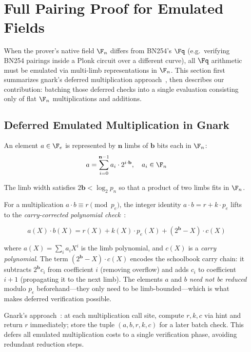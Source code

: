 \section{Full Pairing Proof for Emulated Fields}
\label{sec:emulated}

When the prover's native field $\F_n$ differs from BN254's $\Fq$ (e.g.\ verifying BN254 pairings inside a Plonk circuit over a different curve), all $\Fq$ arithmetic must be emulated via multi-limb representations in $\F_n$. This section first summarizes gnark's deferred multiplication approach~\cite{gnark}, then describes our contribution: batching those deferred checks into a single evaluation consisting only of flat $\F_n$ multiplications and additions.

\subsection{Deferred Emulated Multiplication in Gnark}

An element $a \in \F_e$ is represented by $\mathbf{n}$ limbs of $\mathbf{b}$ bits each in $\F_n$:
$$a = \sum_{i=0}^{\mathbf{n}-1} a_i \cdot 2^{i \cdot \mathbf{b}}, \quad a_i \in \F_n$$

The limb width satisfies $2\mathbf{b} < \log_2 p_n$ so that a product of two limbs fits in $\F_n$.

For a multiplication $a \cdot b \equiv r \pmod{p_e}$, the integer identity $a \cdot b = r + k \cdot p_e$ lifts to the \emph{carry-corrected polynomial check}~\cite{gnark}:

\begin{equation}
  \label{eq:emul-mul}
  a(X) \cdot b(X) = r(X) + k(X) \cdot p_e(X) + (2^{\mathbf{b}} - X) \cdot c(X)
\end{equation}

where $a(X) = \sum_i a_i X^i$ is the limb polynomial, and $c(X)$ is a \emph{carry polynomial}. The term $(2^{\mathbf{b}} - X) \cdot c(X)$ encodes the schoolbook carry chain: it subtracts $2^{\mathbf{b}} c_i$ from coefficient $i$ (removing overflow) and adds $c_i$ to coefficient $i+1$ (propagating it to the next limb). The elements $a$ and $b$ \emph{need not be reduced} modulo $p_e$ beforehand---they only need to be limb-bounded---which is what makes deferred verification possible.

Gnark's approach~\cite{gnark}: at each multiplication call site, compute $r, k, c$ via hint and return $r$ immediately; store the tuple $(a, b, r, k, c)$ for a later batch check. This defers all emulated multiplication costs to a single verification phase, avoiding redundant reduction steps.

